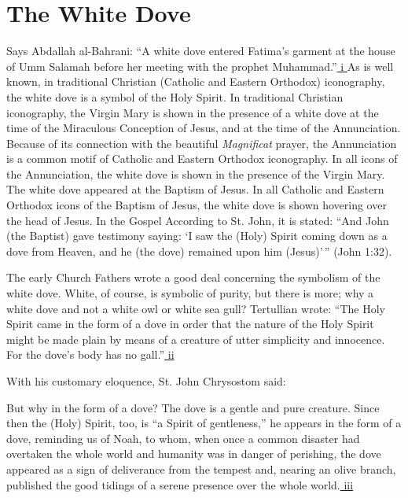 \section{The White Dove}

Says Abdallah al-Bahrani: ``A white dove entered Fatima's garment at the house of Umm Salamah before her meeting with the prophet Muhammad.''\hyperref[_edn1]{ i } As is well known, in traditional Christian (Catholic and Eastern Orthodox) iconography, the white dove is a symbol of the Holy Spirit. In traditional Christian iconography, the Virgin Mary is shown in the presence of a white dove at the time of the Miraculous Conception of Jesus, and at the time of the Annunciation. Because of its connection with the beautiful \emph{Magnificat} prayer, the Annunciation is a common motif of Catholic and Eastern Orthodox iconography. In all icons of the Annunciation, the white dove is shown in the presence of the Virgin Mary. The white dove appeared at the Baptism of Jesus. In all Catholic and Eastern Orthodox icons of the Baptism of Jesus, the white dove is shown hovering over the head of Jesus. In the Gospel According to St. John, it is stated: ``And John (the Baptist) gave testimony saying: `I saw the (Holy) Spirit coming down as a dove from Heaven, and he (the dove) remained upon him (Jesus)'\,'' (John 1:32).

The early Church Fathers wrote a good deal concerning the symbolism of the white dove. White, of course, is symbolic of purity, but there is more; why a white dove and not a white owl or white sea gull? Tertullian wrote: ``The Holy Spirit came in the form of a dove in order that the nature of the Holy Spirit might be made plain by means of a creature of utter simplicity and innocence. For the dove's body has no gall.''\hyperref[_edn2]{ ii }

With his customary eloquence, St. John Chrysostom said:

\begin{quotex}
But why in the form of a dove? The dove is a gentle and pure creature. Since then the (Holy) Spirit, too, is ``a Spirit of gentleness,'' he appears in the form of a dove, reminding us of Noah, to whom, when once a common disaster had overtaken the whole world and humanity was in danger of perishing, the dove appeared as a sign of deliverance from the tempest and, nearing an olive branch, published the good tidings of a serene presence over the whole world.\hyperref[_edn3]{ iii }
\end{quotex}


